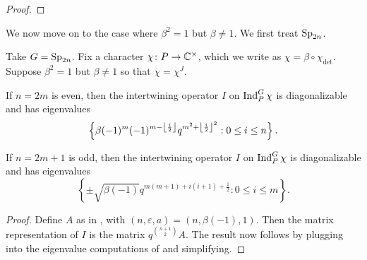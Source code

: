 \begin{proof}
\end{proof}
We now move on to the case where $\beta^2=1$ but $\beta\ne1$. We first treat $\mathrm{Sp}_{2n}$.
\begin{theorem} \label{thm:sp-quadratic-eigens}
    Take $G=\mathrm{Sp}_{2n}$. Fix a character $\chi\colon P\to\mathbb C^\times$, which we write as $\chi=\beta\circ\chi_{\det}$. Suppose $\beta^2=1$ but $\beta\ne1$ so that $\chi=\chi^J$.
    \begin{listalph}
        \item If $n=2m$ is even, then the intertwining operator $I$ on $\operatorname{Ind}_P^G\chi$ is diagonalizable and has eigenvalues
        \[\left\{\beta(-1)^m(-1)^{m-\left\lfloor{\frac i2}\right\rfloor}q^{m^2+\left\lfloor{\frac{i}2}\right\rfloor^2}:0\le i\le n\right\}.\]
        \item If $n=2m+1$ is odd, then the intertwining operator $I$ on $\operatorname{Ind}_P^G\chi$ is diagonalizable and has eigenvalues
        \[\left\{\pm\sqrt{\beta(-1)}q^{m(m+1)+i(i+1)+\frac12}:0\le i\le m\right\}.\]
    \end{listalph}
\end{theorem}
\begin{proof}
    Define $A$ as in , with $(n,\varepsilon,a)=(n,\beta(-1),1)$. Then the matrix representation of $I$ is the matrix $q^{\binom{n+1}2}A$. The result now follows by plugging into the eigenvalue computations of  and simplifying.
\end{proof}
